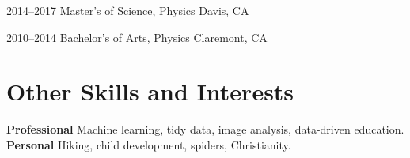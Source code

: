 \documentclass[]{cv-style}          %
\begin{document}
\begin{entrylist}
\entry
{2014--2017}
{Master's of Science, Physics}
{Davis, CA}
{}

{\vspace{-0.2cm}}
\end{entrylist}
\begin{entrylist}
\entry
{2010--2014}
{Bachelor's of Arts, Physics}
{Claremont, CA}
{}
\end{entrylist}


\section{Other Skills and Interests}
  \vspace{-0.2cm}

  \textbf{Professional} \hspace{0.05cm} Machine learning, tidy data, image analysis, data-driven education. \\
  \textbf{Personal} \hspace{0.57cm} Hiking, child development, spiders, Christianity.
  

\end{document}
